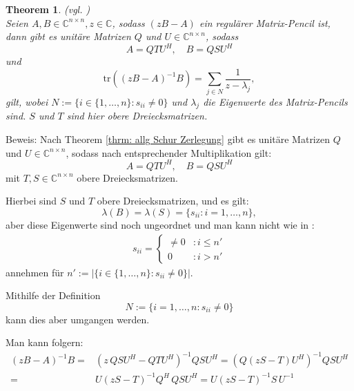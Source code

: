 \documentclass[a4paper,12pt]{report}
\newcommand{\C}{\mathbb C}
\newcommand{\tr}{\text{tr}}
\newcommand{\Cnn}{\C^{n\times n}}
\newcommand{\inv}{^{-1}}
\newcommand{\1}{\mathds{1}}
\theoremstyle{plain} %
\newtheorem{theorem}{Theorem}
\theoremstyle{definition} %
\theoremstyle{remark}
\begin{document}
            \begin{theorem}(vgl. \cite[S. 127]{grundlageFutamura})
                  \label{thrm: IdentitätFutamura}\\
                  Seien $A, B\in\Cnn, z\in \C$, sodass $(zB-A)$ ein regulärer Matrix-Pencil ist, dann gibt es unitäre Matrizen $Q$ und $U \in\Cnn$, sodass
                  $$A = QTU^H,\quad B=QSU^H$$
                  und
                  \begin{equation}
                        \label{eqn: Resultat_Futamura}
                        \tr((zB-A)\inv B) = \sum_{j\in N}\frac{1}{z-\lambda_j},
                  \end{equation}
                  gilt, wobei $N:=\{i\in\{1,\dots,n\}: s_{ii}\ne 0\}$ und $\lambda_j$ die Eigenwerte des Matrix-Pencils sind.
                  $S$ und $T$ sind hier obere Dreiecksmatrizen.
            \end{theorem}
            Beweis:
            Nach Theorem \ref{thrm: allg Schur Zerlegung} gibt es unitäre Matrizen $Q$ und $U\in\Cnn$, sodass nach entsprechender Multiplikation gilt:
            $$A=QTU^H,\quad B=QSU^H$$
            mit $T,S\in\Cnn$ obere Dreiecksmatrizen.
            
            Hierbei sind $S$ und $T$ obere Dreiecksmatrizen, und es gilt:
            $$\lambda(B)=\lambda(S) = \{s_{ii}:i=1,\dots,n\},$$
            aber diese Eigenwerte sind noch ungeordnet und man kann nicht wie in \cite{grundlageFutamura}:
            \begin{align*}
                  s_{ii} = \begin{cases}
                        \ne 0 & : i\le n'\\
                        0 & : i>n'
                  \end{cases}
            \end{align*}
            annehmen für $n':=|\{i\in\{1,\dots,n\}: s_{ii}\ne 0\}|$.

            Mithilfe der Definition
            $$N:=\{i=1,\dots,n: s_{ii}\ne 0\}$$
            kann dies aber umgangen werden.

            Man kann folgern:
            \begin{align*}
                  (zB-A)\inv B =& (z\,QSU^H-QTU^H)\inv QSU^H = (Q(zS-T)U^H)\inv QSU^H \\
                  =& U(zS-T)\inv Q^H\,QSU^H = U(zS-T)\inv S\,U\inv
            \end{align*}
\end{document}

